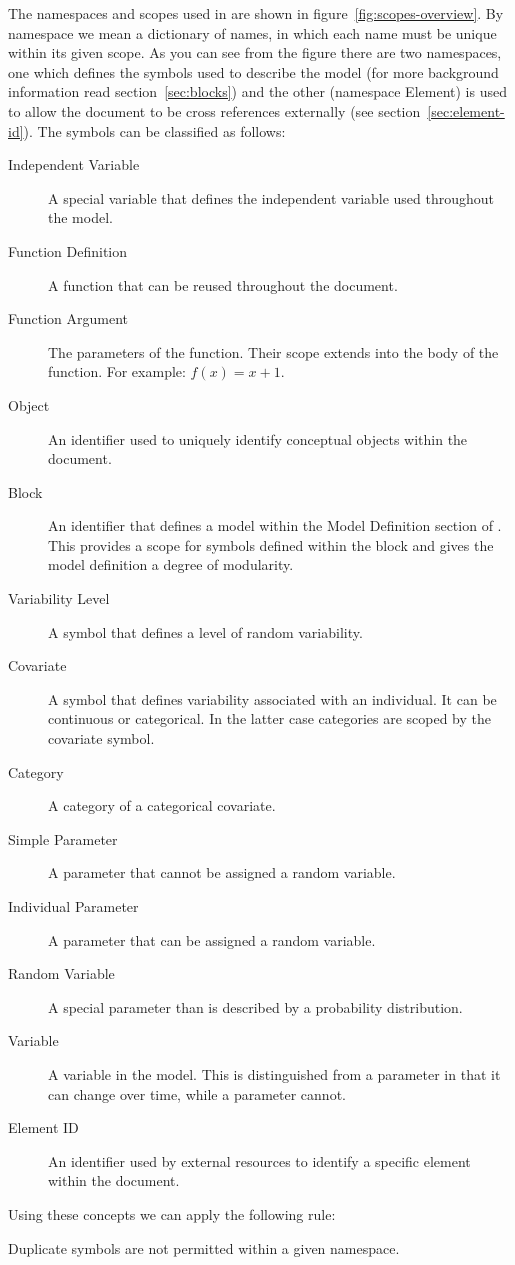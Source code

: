 The namespaces and scopes used in \pharmml are shown in
figure~\ref{fig:scopes-overview}. By namespace we mean a
dictionary of names, in which each name must be unique within its
given scope. As you can see from the figure there are
two namespaces, one which defines the symbols used to describe the
model (for more background information read section~\ref{sec:blocks})
and the other (namespace Element) is used to allow the \pharmml
document to be cross references externally (see
section~\ref{sec:element-id}).  The symbols can be classified as
follows:
\begin{description}
\item[Independent Variable] A special variable that defines the
  independent variable used throughout the model.
\item[Function Definition] A function that can be reused throughout
  the \pharmml document.
\item[Function Argument] The parameters of the function. Their scope
  extends into the body of the function. For example: $f(x) = x + 1$.
\item[Object] An identifier used to uniquely identify conceptual
  objects within the \pharmml document.
\item[Block] An identifier that defines a model within the Model
  Definition section of \pharmml. This provides a scope for symbols
  defined within the block and gives the model definition a degree of
  modularity.
\item[Variability Level] A symbol that defines a level of random
  variability.
\item[Covariate] A symbol that defines variability associated with an
  individual. It can be continuous or categorical. In the latter case
  categories are scoped by the covariate symbol.
\item[Category] A category of a categorical covariate.
\item[Simple Parameter] A parameter that cannot be assigned a random variable.
\item[Individual Parameter] A parameter that can be assigned a random
  variable.
\item[Random Variable] A special parameter than is described by a
  probability distribution.
\item[Variable] A variable in the model. This is distinguished from a
  parameter in that it can change over time, while a parameter cannot.
\item[Element ID] An identifier used by external resources to identify
  a specific element within the \pharmml document.
\end{description}
%
Using these concepts we can apply the following rule:
%
\begin{valrules}
   Duplicate
  symbols are not permitted within a given namespace.
\end{valrules}

